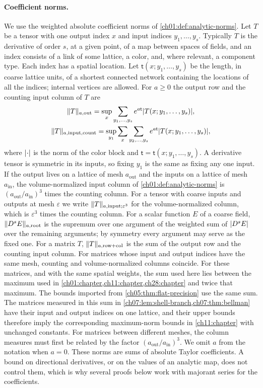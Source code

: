 \paragraph{Coefficient norms.}
We use the weighted absolute coefficient norms of \cref{ch01:def:analytic-norms}. Let $T$ be a tensor with one output index $x$ and input indices $y_1,\dots,y_s$. Typically $T$ is the derivative of order $s$, at a given point, of a map between spaces of fields, and an index consists of a link of some lattice, a color, and, where relevant, a component type. Each index has a spatial location. Let $\mathsf t(x;y_1,\dots,y_s)$ be the length, in coarse lattice units, of a shortest connected network containing the locations of all the indices; internal vertices are allowed. For $a\ge0$ the output row and the counting input column of $T$ are
\begin{gather*}
 \lVert T\rVert_{a,\mathrm{out}}=\sup_x\sum_{y_1,\dots,y_s}e^{a\mathsf t}\lvert T(x;y_1,\dots,y_s)\rvert,\\
 \lVert T\rVert_{a,\mathrm{input,count}}=\sup_{y_1}\sum_x\sum_{y_2,\dots,y_s}e^{a\mathsf t}\lvert T(x;y_1,\dots,y_s)\rvert,
\end{gather*}
where $\lvert \cdot\rvert$ is the norm of the color block and $\mathsf t=\mathsf t(x;y_1,\dots,y_s)$. A derivative tensor is symmetric in its inputs, so fixing $y_1$ is the same as fixing any one input. If the output lives on a lattice of mesh $a_{\mathrm{out}}$ and the inputs on a lattice of mesh $a_{\mathrm{in}}$, the volume-normalized input column of \cref{ch01:def:analytic-norms} is $(a_{\mathrm{out}}/a_{\mathrm{in}})^3$ times the counting column. For a tensor with coarse inputs and outputs at mesh $\varepsilon$ we write $\lVert T\rVert_{a,\mathrm{input};\varepsilon^3}$ for the volume-normalized column, which is $\varepsilon^3$ times the counting column. For a scalar function $E$ of a coarse field, $\lVert D^sE\rVert_{a,\mathrm{root}}$ is the supremum over one argument of the weighted sum of $\lvert D^sE\rvert$ over the remaining arguments; by symmetry every argument may serve as the fixed one. For a matrix $T$, $\lVert T\rVert_{a,\mathrm{row+col}}$ is the sum of the output row and the counting input column. For matrices whose input and output indices have the same mesh, counting and volume-normalized columns coincide. For these matrices, and with the same spatial weights, the sum used here lies between the maximum used in \cref{ch01:chapter,ch11:chapter,ch28:chapter} and twice that maximum. The bounds imported from \cref{ch05:thm:flat-precision} use the same sum. The matrices measured in this sum in \cref{ch07:lem:shell-branch,ch07:thm:bellman} have their input and output indices on one lattice, and their upper bounds therefore imply the corresponding maximum-norm bounds in \cref{ch11:chapter} with unchanged constants. For matrices between different meshes, the column measures must first be related by the factor $(a_{\mathrm{out}}/a_{\mathrm{in}})^3$. We omit $a$ from the notation when $a=0$. These norms are sums of absolute Taylor coefficients. A bound on directional derivatives, or on the values of an analytic map, does not control them, which is why several proofs below work with majorant series for the coefficients.

